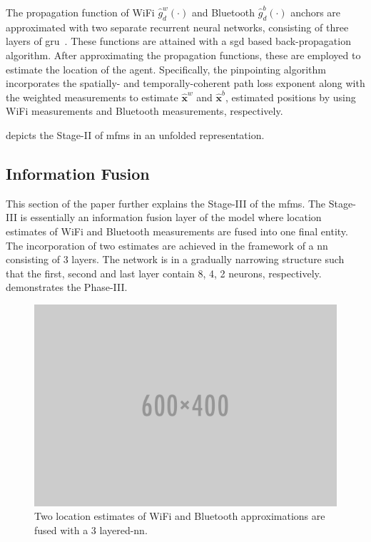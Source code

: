     The propagation function of WiFi $\hat{g}^w_d(\cdot)$ and Bluetooth $\hat{g}^b_d(\cdot)$ anchors are approximated with two separate recurrent neural networks, consisting of three layers of \gls{gru}~\cite{cho2014learning}.
    These functions are attained with a \gls{sgd} based back-propagation algorithm.
    After approximating the propagation functions, these are employed to estimate the location of the agent.
    Specifically, the pinpointing algorithm incorporates the spatially- and temporally-coherent path loss exponent along with the weighted measurements to estimate $\bm{\hat{x}}^w$ and $\bm{\hat{x}}^b$, estimated positions by using WiFi measurements and Bluetooth measurements, respectively.

     depicts the Stage-II of \gls{mfms} in an unfolded representation.


    \subsection{Information Fusion}
    This section of the paper further explains the Stage-III of the \gls{mfms}.
    The Stage-III is essentially an information fusion layer of the model where location estimates of WiFi and Bluetooth measurements are fused into one final entity.
    The incorporation of two estimates are achieved in the framework of a \gls{nn} consisting of 3 layers.
    The network is in a gradually narrowing structure such that the first, second and last layer contain 8, 4, 2 neurons, respectively.
     demonstrates the Phase-III\@.

    \begin{figure}[thpb]
       \centering
       \includegraphics[width=\linewidth]{figures/placeholder.png}
       \caption{\label{fig:fusion}Two location estimates of WiFi and Bluetooth approximations are fused with a 3 layered-\gls{nn}.}
    \end{figure}
